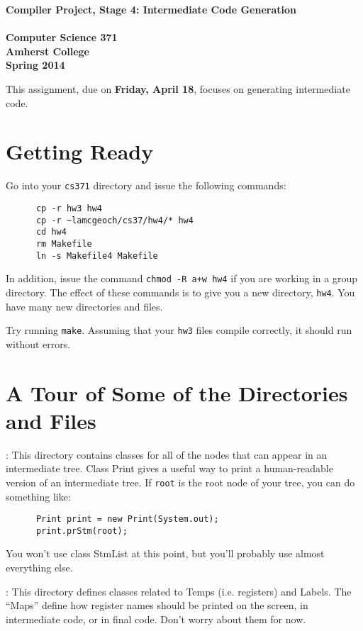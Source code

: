 \documentclass[11pt]{article}
\begin{document}
\begin{center}
\Large \bf Compiler Project, Stage 4: Intermediate Code Generation\\ \mbox{} \\
\large Computer Science 371 \\
\large Amherst College \\
\large Spring 2014
\end{center}

This assignment, due on {\bf Friday, April 18}, focuses on generating intermediate code.

\section{Getting Ready}

Go into your \verb'cs371' directory and issue the following commands:
\begin{verbatim}
      cp -r hw3 hw4                  
      cp -r ~lamcgeoch/cs37/hw4/* hw4
      cd hw4
      rm Makefile
      ln -s Makefile4 Makefile
\end{verbatim}
In addition, issue the command \verb'chmod -R a+w hw4' if you are working in a group directory.
The effect of these commands is to give you a new directory, \verb'hw4'.  You have many new directories and files.

Try running \verb'make'.  Assuming that your \verb'hw3' files compile correctly, it should run without errors.

\section{A Tour of Some of the Directories and Files}

\mbox{}\par{}:  This directory contains classes for all of the nodes that can appear in an intermediate tree.  Class Print gives a useful way to print a human-readable version of an intermediate tree.  If \verb'root' is the root node of your tree, you can do something like:
\begin{verbatim}
      Print print = new Print(System.out);
      print.prStm(root);
\end{verbatim}
You won't use class StmList at this point, but you'll probably use almost everything else.

\mbox{}\par{}:  This directory defines classes related to Temps (i.e. registers) and Labels.  The ``Maps'' define how register names should be printed on the screen, in intermediate code, or in final code.  Don't worry about them for now.
\end{document}
